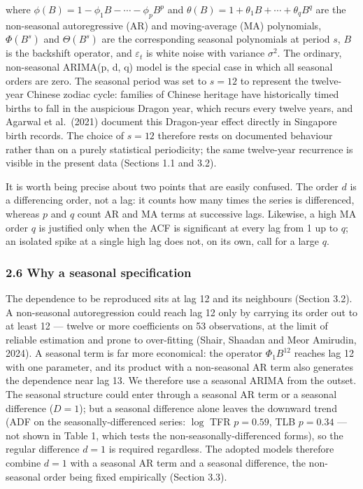 \documentclass[
  11pt,
]{article}
\begin{document}
where \(\phi(B) = 1 - \phi_1 B - \cdots - \phi_p B^p\) and
\(\theta(B) = 1 + \theta_1 B + \cdots + \theta_q B^q\) are the
non-seasonal autoregressive (AR) and moving-average (MA) polynomials,
\(\Phi(B^s)\) and \(\Theta(B^s)\) are the corresponding seasonal
polynomials at period \(s\), \(B\) is the backshift operator, and
\(\varepsilon_t\) is white noise with variance \(\sigma^2\). The
ordinary, non-seasonal ARIMA(p, d, q) model is the special case in which
all seasonal orders are zero. The seasonal period was set to \(s = 12\)
to represent the twelve-year Chinese zodiac cycle: families of Chinese
heritage have historically timed births to fall in the auspicious Dragon
year, which recurs every twelve years, and Agarwal et al.~(2021)
document this Dragon-year effect directly in Singapore birth records.
The choice of \(s = 12\) therefore rests on documented behaviour rather
than on a purely statistical periodicity; the same twelve-year
recurrence is visible in the present data (Sections 1.1 and 3.2).

It is worth being precise about two points that are easily confused. The
order \(d\) is a differencing order, not a lag: it counts how many times
the series is differenced, whereas \(p\) and \(q\) count AR and MA terms
at successive lags. Likewise, a high MA order \(q\) is justified only
when the ACF is significant at every lag from 1 up to \(q\); an isolated
spike at a single high lag does not, on its own, call for a large \(q\).

\subsubsection{2.6 Why a seasonal
specification}\label{why-a-seasonal-specification}

The dependence to be reproduced sits at lag 12 and its neighbours
(Section 3.2). A non-seasonal autoregression could reach lag 12 only by
carrying its order out to at least 12 --- twelve or more coefficients on
53 observations, at the limit of reliable estimation and prone to
over-fitting (Shair, Shaadan and Meor Amirudin, 2024). A seasonal term
is far more economical: the operator \(\Phi_1 B^{12}\) reaches lag 12
with one parameter, and its product with a non-seasonal AR term also
generates the dependence near lag 13. We therefore use a seasonal ARIMA
from the outset. The seasonal structure could enter through a seasonal
AR term or a seasonal difference (\(D = 1\)); but a seasonal difference
alone leaves the downward trend (ADF on the seasonally-differenced
series: \(\log\) TFR \(p = 0.59\), TLB \(p = 0.34\) --- not shown in
Table 1, which tests the non-seasonally-differenced forms), so the
regular difference \(d = 1\) is required regardless. The adopted models
therefore combine \(d = 1\) with a seasonal AR term and a seasonal
difference, the non-seasonal order being fixed empirically (Section
3.3).
\end{document}
